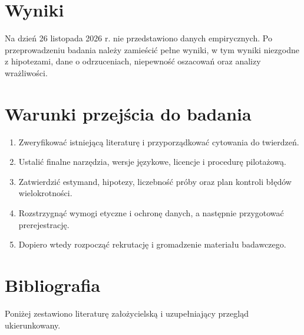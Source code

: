 \documentclass[11pt,a4paper]{article}
\begin{document}
\section{Wyniki}
Na dzień 26 listopada 2026 r. nie przedstawiono danych empirycznych. Po przeprowadzeniu badania należy zamieścić pełne wyniki, w tym wyniki niezgodne z hipotezami, dane o odrzuceniach, niepewność oszacowań oraz analizy wrażliwości.
\section{Warunki przejścia do badania}
\begin{enumerate}
\item Zweryfikować istniejącą literaturę i przyporządkować cytowania do twierdzeń.
\item Ustalić finalne narzędzia, wersje językowe, licencje i procedurę pilotażową.
\item Zatwierdzić estymand, hipotezy, liczebność próby oraz plan kontroli błędów wielokrotności.
\item Rozstrzygnąć wymogi etyczne i ochronę danych, a następnie przygotować prerejestrację.
\item Dopiero wtedy rozpocząć rekrutację i gromadzenie materiału badawczego.
\end{enumerate}
\section*{Bibliografia}
Poniżej zestawiono literaturę założycielską i uzupełniający przegląd ukierunkowany. 
\end{document}
